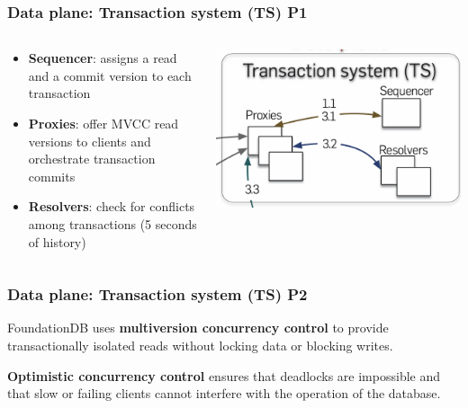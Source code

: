 

\begin{frame}
    \frametitle{Data plane: Transaction system (TS) P1}
    \begin{columns}
        \begin{column}{0.5\textwidth}
        \begin{itemize}
    \item \textbf{Sequencer}: assigns a read and a commit version to each transaction
    \item \textbf{Proxies}: offer MVCC read versions to clients and orchestrate transaction commits
    \item \textbf{Resolvers}: check for conflicts among transactions (5 seconds of history)
   \end{itemize}
        
        \end{column}
        \begin{column}{0.5\textwidth}
            \centering
            \includegraphics[width=\textwidth]{img/2-Architecture/Transaction System.png}
        \end{column}
    \end{columns}
\end{frame}


\begin{frame}
	\frametitle{Data plane: Transaction system (TS) P2}

FoundationDB uses \textbf{multiversion concurrency control} to provide transactionally isolated reads without locking data or blocking writes.
\vspace{0.5cm}

\textbf{Optimistic concurrency control} ensures that deadlocks are impossible and that slow or failing clients cannot interfere with the operation of the database.
	
\end{frame}

